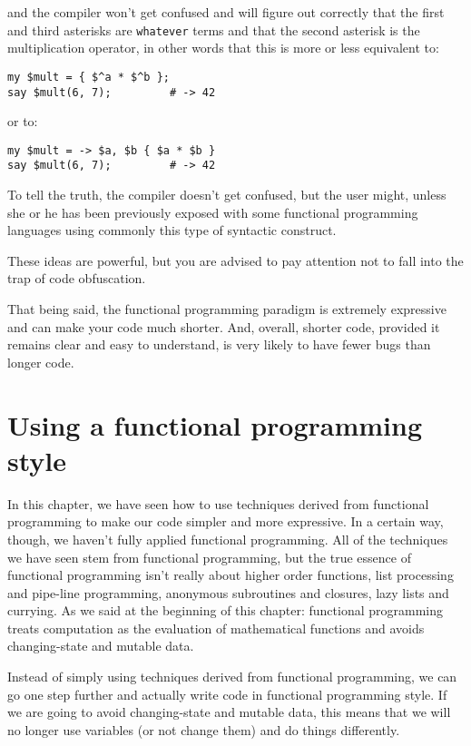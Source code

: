 and the compiler won't get confused and will figure out 
correctly that the first and third asterisks are 
\verb'whatever' terms and that the second asterisk is 
the multiplication operator, in other words that this is 
more or less equivalent to:

\begin{verbatim}
my $mult = { $^a * $^b };
say $mult(6, 7);         # -> 42
\end{verbatim}

or to:

\begin{verbatim}
my $mult = -> $a, $b { $a * $b }
say $mult(6, 7);         # -> 42  
\end{verbatim}

To tell the truth, the compiler doesn't get confused, 
but the user might, unless she or he has been previously 
exposed with some functional programming languages using 
commonly this type of syntactic construct. 

These ideas are powerful, but you are advised to pay 
attention not to fall into the trap of code obfuscation.

That being said, the functional programming paradigm 
is extremely expressive and can make your code much 
shorter. And, overall, shorter code, provided it remains 
clear and easy to understand, is very likely to have 
fewer bugs than longer code.

\section{Using a functional programming style}
\label{funcstyle}

In this chapter, we have seen how to use techniques derived 
from functional programming to make our code simpler and 
more expressive. In a certain way, though, we haven't fully 
applied functional programming. All of the techniques we have 
seen stem from functional programming, but the true essence 
of functional programming isn't really about higher order 
functions, list processing and pipe-line programming, 
anonymous subroutines and closures, lazy lists and currying. 
As we said at the beginning of this chapter: functional 
programming treats computation as the evaluation of mathematical 
functions and avoids changing-state and mutable data.

Instead of simply using techniques derived from functional 
programming, we can go one step further and actually 
write code in functional programming style. If we are going 
to avoid changing-state and mutable data, this means that 
we will no longer use variables (or not change them) and 
do things differently.

